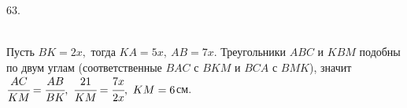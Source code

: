 63. \begin{figure}[ht!]
\end{figure}\\
Пусть $BK=2x,$ тогда $KA=5x,\ AB=7x.$ Треугольники $ABC$ и $KBM$ подобны по двум углам (соответственные $BAC$ с $BKM$ и $BCA$ с $BMK$), значит $\cfrac{AC}{KM}=\cfrac{AB}{BK},\ \cfrac{21}{KM}=\cfrac{7x}{2x},\ KM=6$см.\\

